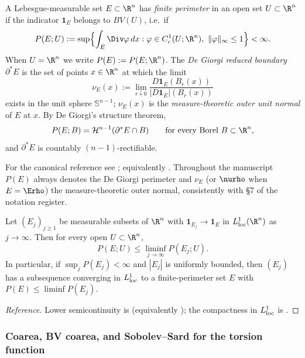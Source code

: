 \begin{definition}
\label{def:perimeter}
A Lebesgue-measurable set $E\subset\R^n$ has \emph{finite perimeter}
in an open set $U\subset\R^n$ if the indicator $\mathbf 1_E$ belongs
to $BV(U)$, i.e.\ if
\[
   P(E;U):=\sup\Bigl\{
      \int_E \Div\varphi\,dx :
      \varphi\in C^1_c(U;\R^n),\ \|\varphi\|_\infty\le1
   \Bigr\}<\infty.
\]
When $U=\R^n$ we write $P(E):=P(E;\R^n)$.  The
\emph{De Giorgi reduced boundary} $\partial^*E$ is the set of points
$x\in\R^n$ at which the limit
\[
   \nu_E(x)
   :=\lim_{r\downarrow0}
      \frac{D\mathbf 1_E(B_r(x))}{|D\mathbf 1_E|(B_r(x))}
\]
exists in the unit sphere $\mathbb S^{n-1}$; $\nu_E(x)$ is the
\emph{measure-theoretic outer unit normal} of $E$ at $x$.
By De Giorgi's structure theorem,
\[
   P(E;B)=\mathcal H^{n-1}(\partial^*E\cap B)
   \qquad\text{for every Borel } B\subset\R^n,
\]
and $\partial^*E$ is countably $(n-1)$-rectifiable.
\end{definition}

For the canonical reference see
\cite[Def.~12.1, Thm.~15.9]{Maggi2012}; equivalently
\cite[Def.~3.1, Thm.~3.59]{AFP2000}.  Throughout the manuscript
$P(E)$ always denotes the De Giorgi perimeter and $\nu_E$ (or $\nurho$
when $E=\Erho$) the measure-theoretic outer normal, consistently with
\S 7 of the notation register.

\begin{proposition}
\label{prop:lsc-perimeter}
Let $(E_j)_{j\ge1}$ be measurable subsets of $\R^n$ with
$\mathbf 1_{E_j}\to\mathbf 1_E$ in $L^1_{\rm loc}(\R^n)$ as
$j\to\infty$.  Then for every open $U\subset\R^n$,
\[
   P(E;U)\le\liminf_{j\to\infty}P(E_j;U).
\]
In particular, if $\sup_j P(E_j)<\infty$ and $|E_j|$ is uniformly
bounded, then $(E_j)$ has a subsequence converging in $L^1_{\rm loc}$
to a finite-perimeter set $E$ with $P(E)\le\liminf P(E_j)$.
\end{proposition}

\begin{proof}[Reference]
Lower semicontinuity is
\cite[Prop.~12.15]{Maggi2012} (equivalently
\cite[Thm.~3.7]{AFP2000}); the compactness in $L^1_{\rm loc}$ is
\cite[Thm.~12.26]{Maggi2012}.
\end{proof}

\subsubsection{Coarea, BV coarea, and Sobolev--Sard for the torsion
            function}
\label{ssec:prelim-coarea}

